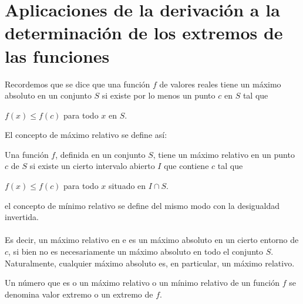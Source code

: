 \section{Aplicaciones de la derivación a la determinación de los extremos de las funciones}

Recordemos que se dice que una función $f$ de valores reales tiene un máximo absoluto en un conjunto $S$ si existe por lo menos un punto $c$ en $S$ tal que
\begin{center}
    $f(x)\leq f(c)$ para todo $x$ en $S$.
\end{center}

El concepto de máximo relativo se define así:

\begin{tcolorbox}
    \begin{def.}
	Una función $f$, definida en un conjunto $S$, tiene un máximo relativo en un punto $c$ de $S$ si existe un cierto intervalo abierto $I$ que contiene $c$ tal que 
	\begin{center}
	    $f(x)\leq f(c)$ para todo $x$ situado en $I\cap S$.
	\end{center}
	el concepto de mínimo relativo se define del mismo modo con la desigualdad invertida.\\\\
	Es decir, un máximo relativo en e es un máximo absoluto en un cierto entorno de $c$, si bien no es necesariamente un máximo absoluto en todo el conjunto $S$. Naturalmente, cualquier máximo absoluto es, en particular, un máximo relativo.
    \end{def.}
\end{tcolorbox}

\begin{tcolorbox}
    \begin{def.}
	Un número que es o un máximo relativo o un mínimo relativo de un función $f$ se denomina valor extremo o un extremo de $f$.
    \end{def.}
\end{tcolorbox}

